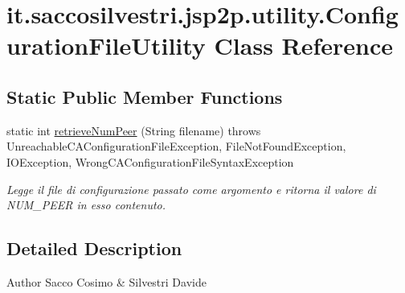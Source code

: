 \hypertarget{classit_1_1saccosilvestri_1_1jsp2p_1_1utility_1_1_configuration_file_utility}{
\section{it.saccosilvestri.jsp2p.utility.\-Configuration\-File\-Utility \-Class \-Reference}
\label{classit_1_1saccosilvestri_1_1jsp2p_1_1utility_1_1_configuration_file_utility}
}
\subsection*{\-Static \-Public \-Member \-Functions}
\begin{DoxyCompactItemize}
\item 
static int \hyperlink{classit_1_1saccosilvestri_1_1jsp2p_1_1utility_1_1_configuration_file_utility_a0358e912d7a2e9d8f9ffe6f94985b9ee}{retrieve\-Num\-Peer} (\-String filename)  throws Unreachable\-C\-A\-Configuration\-File\-Exception, 			\-File\-Not\-Found\-Exception, I\-O\-Exception, 			\-Wrong\-C\-A\-Configuration\-File\-Syntax\-Exception 
\begin{DoxyCompactList}\small\item\em \-Legge il file di configurazione passato come argomento e ritorna il valore di \-N\-U\-M\-\_\-\-P\-E\-E\-R in esso contenuto. \end{DoxyCompactList}\end{DoxyCompactItemize}


\subsection{\-Detailed \-Description}
\begin{DoxyAuthor}{\-Author}
\-Sacco \-Cosimo \& \-Silvestri \-Davide 
\end{DoxyAuthor}


